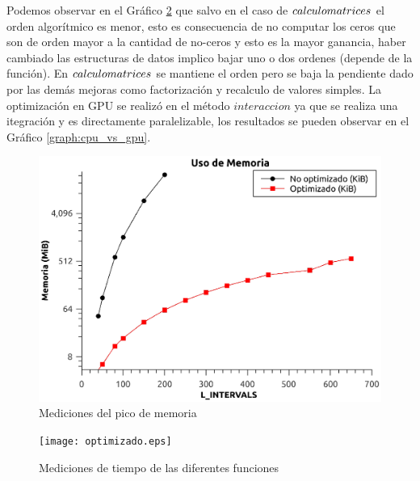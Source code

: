 \documentclass[a4paper,openright,12pt, oneside]{book}
\begin{document}
Podemos observar en el Gr\'afico \ref{graph:c_vs_fortran} que salvo en el caso de $calculo\-matrices$ el orden algor\'itmico es menor, esto es consecuencia de no computar los ceros que son de orden mayor a la cantidad de no-ceros y esto es la mayor ganancia, haber cambiado las estructuras de datos implico bajar uno o dos ordenes (depende de la funci\'on). En $calculo\-matrices$ se mantiene el orden pero se baja la pendiente dado por las dem\'as mejoras como factorizaci\'on y recalculo de valores simples.
La optimizaci\'on en GPU se realiz\'o en el m\'etodo $interaccion$ ya que se realiza una itegraci\'on y es directamente paralelizable, los resultados se pueden observar en el Gr\'afico \ref{graph:cpu_vs_gpu}.



\begin{figure}[!htbp]
  \begin{center}
    \leavevmode

    \includegraphics[scale=0.8]{memoria.eps}

    \caption{Mediciones del pico de memoria}
    \label{graph:memoria}
  \end{center}
\end{figure}

\begin{figure}[!htbp]
  \begin{center}
    \leavevmode

    \texttt{[image: optimizado.eps]}

    \caption{Mediciones de tiempo de las diferentes funciones}
    \label{graph:c_vs_fortran}
  \end{center}
\end{figure}
\end{document}
